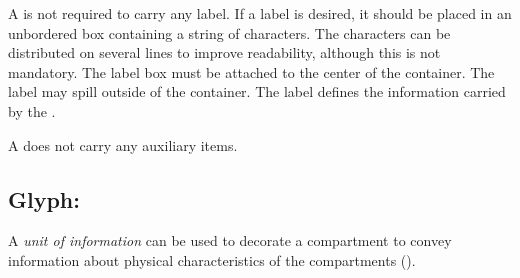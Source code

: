\begin{glyphDescription}
\glyphLabel A  is not required to carry any label.   If a label is desired, it should be placed in an unbordered box containing a string of characters. The characters can be distributed on several lines to improve readability, although this is not mandatory.  The label box must be attached to the center of the container. The label may spill outside of the container.  The label defines the information carried by the .

\glyphAux A  does not carry any auxiliary items.

\end{glyphDescription}

\subsection{Glyph: }
\label{sec:af:unitInfoComp}

A \emph{unit of information} can be used to decorate a compartment to convey information about physical characteristics of the compartments (). 

